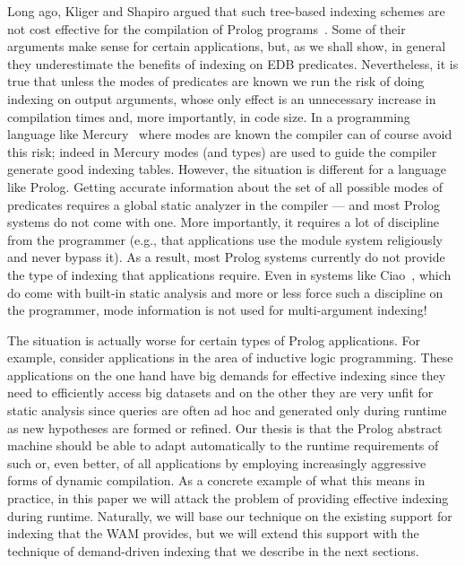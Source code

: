 \documentclass{llncs}
\newcommand{\JITI}{demand-driven indexing\xspace}
\begin{document}
Long ago, Kliger and Shapiro argued that such tree-based indexing
schemes are not cost effective for the compilation of Prolog
programs~\cite{KligerShapiro@ICLP-88}. Some of their arguments make
sense for certain applications, but, as we shall show, in general 
they underestimate the benefits of indexing on EDB predicates.
Nevertheless, it is true that unless the modes of
predicates are known we run the risk of doing indexing on output
arguments, whose only effect is an unnecessary increase in compilation
times and, more importantly, in code size. In a programming language
like Mercury~\cite{Mercury@JLP-96} where modes are known the compiler
can of course avoid this risk; indeed in Mercury modes (and types) are
used to guide the compiler generate good indexing tables. However, the
situation is different for a language like Prolog. Getting accurate
information about the set of all possible modes of predicates requires
a global static analyzer in the compiler --- and most Prolog systems
do not come with one. More importantly, it requires a lot of
discipline from the programmer (e.g., that applications use the module
system religiously and never bypass it). As a result, most Prolog
systems currently do not provide the type of indexing that
applications require. Even in systems like Ciao~\cite{Ciao@SCP-05},
which do come with built-in static analysis and more or less force
such a discipline on the programmer, mode information is not used for
multi-argument indexing!

The situation is actually worse for certain types of Prolog
applications. For example, consider applications in the area of
inductive logic programming. These applications on the one hand have
big demands for effective indexing since they need to efficiently
access big datasets and on the other they are very unfit for static
analysis since queries are often ad hoc and generated only during
runtime as new hypotheses are formed or refined.
%
Our thesis is that the Prolog abstract machine should be able to adapt
automatically to the runtime requirements of such or, even better, of
all applications by employing increasingly aggressive forms of dynamic
compilation. As a concrete example of what this means in practice, in
this paper we will attack the problem of providing effective indexing
during runtime. Naturally, we will base our technique on the existing
support for indexing that the WAM provides, but we will extend this
support with the technique of \JITI that we describe in the next
sections.
\end{document}
